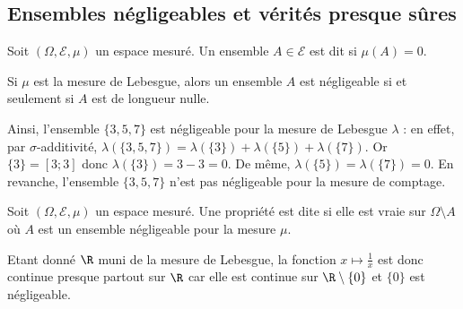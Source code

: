 %	

%

\subsection{Ensembles négligeables et vérités presque sûres}

\begin{definition}{}{}
	Soit $(\Omega,\mathcal{E},\mu)$ un espace mesuré. Un ensemble $A \in \mathcal{E}$ est dit  si $\mu(A)=0$.
\end{definition}

\begin{exemple}{}{}
Si $\mu$ est la mesure de Lebesgue, alors un ensemble $A$ est négligeable si et seulement si $A$ est de longueur nulle.
\end{exemple}

Ainsi, l'ensemble $\{3,5,7\}$ est négligeable pour la mesure de Lebesgue $\lambda$ : en effet, par $\sigma$-additivité, $\lambda(\{3,5,7\}) = \lambda(\{3\})+\lambda(\{5\})+\lambda(\{7\})$. Or $\{3\} = [3;3]$ donc $\lambda(\{3\}) = 3-3 = 0$. De même, $\lambda(\{5\})=\lambda(\{7\})=0$. En revanche, l'ensemble $\{3,5,7\}$ n'est pas négligeable pour la mesure de comptage. 

\begin{definition}{}{}
	Soit $(\Omega,\mathcal{E},\mu)$ un espace mesuré. Une propriété est dite  si elle est vraie sur $\Omega \setminus A$ où $A$ est un ensemble négligeable pour la mesure $\mu$.
\end{definition}

Etant donné $\R$ muni de la mesure de Lebesgue, la fonction $x \mapsto \frac{1}{x}$ est donc continue presque partout sur $\R$ car elle est continue sur $\R \setminus \{0\}$ et $\{0\}$ est négligeable.

